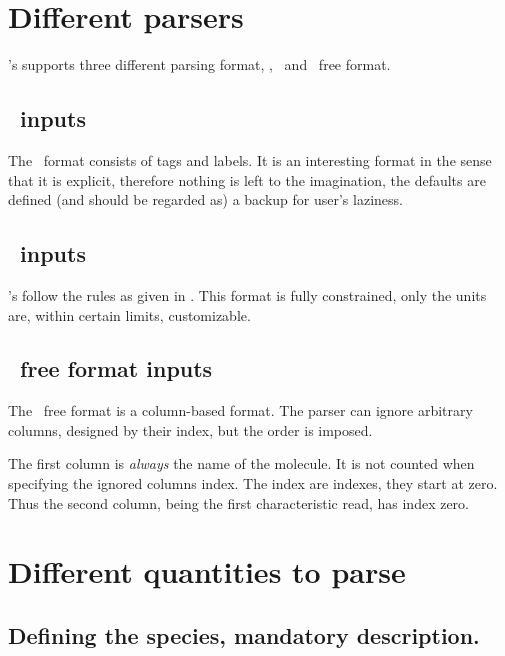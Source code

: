 \section{Different parsers}

\Antioch's supports three different parsing format,
\ChemKin, \XML\ and \ascii\ free format.

\subsection{\XML\ inputs}

The \XML\ format consists of tags and labels. It is an interesting
format in the sense that it is explicit, therefore nothing is
left to the imagination, the defaults are defined (and should be
regarded as) a backup for user's laziness.

\subsection{\ChemKin\ inputs}

\Antioch's follow the rules as given in \citet{ChemKinReacDesign2000}.
This format is fully constrained, only the units are, within
certain limits, customizable.

\subsection{\ascii\ free format inputs}

The \ascii\ free format is a column-based format. The parser can
ignore arbitrary columns, designed by their index, but the order
is imposed.

The first column is \emph{always} the name of the molecule. It is
not counted when specifying the ignored columns index. The index
are  indexes, they start at zero. Thus the second column,
being the first characteristic read, has index zero.

\section{Different quantities to parse}

\subsection{Defining the species, mandatory description.}

